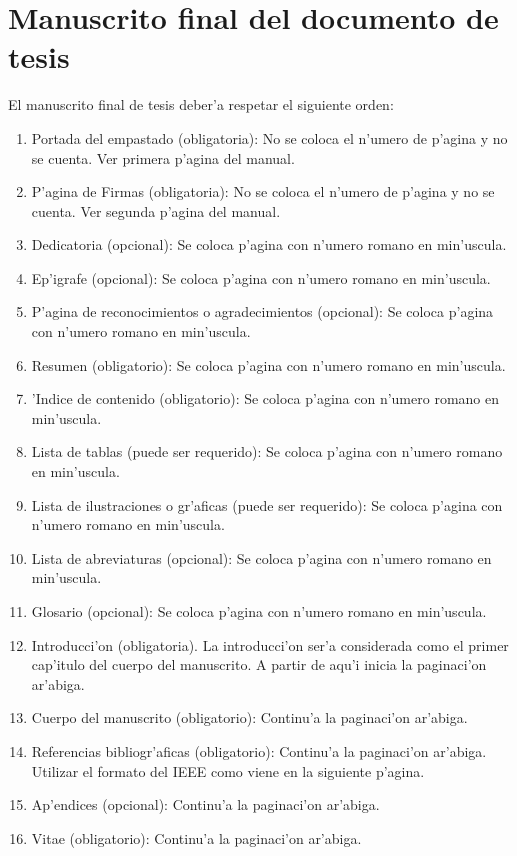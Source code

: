 \section{Manuscrito final del documento de tesis}
\noindent
El manuscrito final de tesis deber'a respetar el siguiente orden:
\begin{enumerate}
	\item Portada del empastado (obligatoria): No se coloca el n'umero de p'agina y no se cuenta. Ver primera p'agina del manual.
	\item P'agina de Firmas (obligatoria): No se coloca el n'umero de p'agina y no se cuenta. Ver segunda p'agina del manual.
	\item Dedicatoria (opcional): Se coloca p'agina con n'umero romano en min'uscula.
	\item Ep'igrafe (opcional): Se coloca p'agina con n'umero romano en min'uscula.
	\item P'agina de reconocimientos o agradecimientos (opcional): Se coloca p'agina con n'umero romano en min'uscula.
	\item Resumen (obligatorio): Se coloca p'agina con n'umero romano en min'uscula.
	\item 'Indice de contenido (obligatorio): Se coloca p'agina con n'umero romano en min'uscula.
	\item Lista de tablas (puede ser requerido): Se coloca p'agina con n'umero romano en min'uscula.
	\item Lista de ilustraciones o gr'aficas (puede ser requerido): Se coloca p'agina con n'umero romano en min'uscula.
	\item Lista de abreviaturas (opcional): Se coloca p'agina con n'umero romano en min'uscula.
	\item Glosario (opcional): Se coloca p'agina con n'umero romano en min'uscula.
	\item Introducci'on (obligatoria). La introducci'on ser'a considerada como el primer cap'itulo del cuerpo del manuscrito. A partir de aqu'i inicia la paginaci'on ar'abiga.
	\item Cuerpo del manuscrito (obligatorio): Continu'a la paginaci'on ar'abiga.
	\newpage
	\item Referencias bibliogr'aficas (obligatorio): Continu'a la paginaci'on ar'abiga. Utilizar el formato del IEEE como viene en la siguiente p'agina.
	\item Ap'endices (opcional): Continu'a la paginaci'on ar'abiga.
	\item Vitae (obligatorio): Continu'a la paginaci'on ar'abiga.
\end{enumerate}

\clearpage
